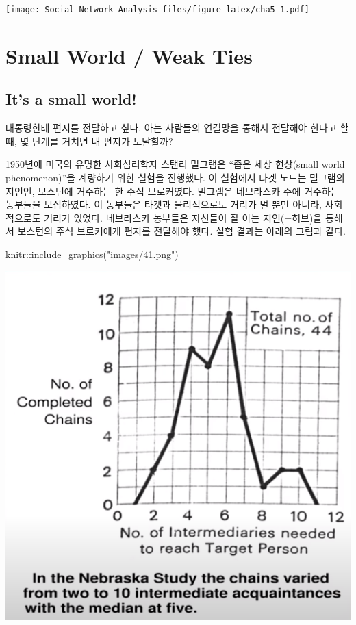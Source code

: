 \documentclass[
]{book}
\newenvironment{Shaded}{\begin{snugshade}}{\end{snugshade}}
\newcommand{\FunctionTok}[1]{\textcolor[rgb]{0.00,0.00,0.00}{#1}}
\newcommand{\NormalTok}[1]{#1}
\newcommand{\SpecialCharTok}[1]{\textcolor[rgb]{0.00,0.00,0.00}{#1}}
\newcommand{\StringTok}[1]{\textcolor[rgb]{0.31,0.60,0.02}{#1}}
\begin{document}
\texttt{[image: Social\_Network\_Analysis\_files/figure-latex/cha5-1.pdf]}

\hypertarget{small-world-weak-ties}{%
\chapter{Small World / Weak Ties}\label{small-world-weak-ties}}

\hypertarget{its-a-small-world}{%
\section{It's a small world!}\label{its-a-small-world}}

대통령한테 편지를 전달하고 싶다. 아는 사람들의 연결망을 통해서 전달해야 한다고 할 때, 몇 단계를 거치면 내 편지가 도달할까?

1950년에 미국의 유명한 사회심리학자 스탠리 밀그램은 ``좁은 세상 현상(small world phenomenon)''을 계량하기 위한 실험을 진행했다. 이 실험에서 타겟 노드는 밀그램의 지인인, 보스턴에 거주하는 한 주식 브로커였다. 밀그램은 네브라스카 주에 거주하는 농부들을 모집하였다. 이 농부들은 타겟과 물리적으로도 거리가 멀 뿐만 아니라, 사회적으로도 거리가 있었다. 네브라스카 농부들은 자신들이 잘 아는 지인(=허브)을 통해서 보스턴의 주식 브로커에게 편지를 전달해야 했다. 실험 결과는 아래의 그림과 같다.

\begin{Shaded}
\begin{Highlighting}[]
\NormalTok{knitr}\SpecialCharTok{::}\FunctionTok{include\_graphics}\NormalTok{(}\StringTok{"images/41.png"}\NormalTok{)}
\end{Highlighting}
\end{Shaded}

\begin{center}\includegraphics[width=0.8\linewidth]{images/41} \end{center}
\end{document}
